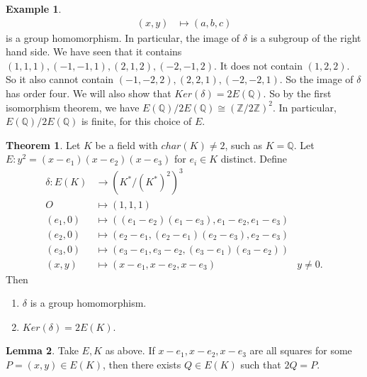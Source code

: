 \documentclass{article}
\newcommand{\Z}{\mathbb{Z}}
\newcommand{\Q}{\mathbb{Q}}
\newcommand{\rb}[1]{\left( #1 \right)}
\theoremstyle{definition}\newtheorem{definition}{Definition}[section]
\theoremstyle{definition}\newtheorem{remark}[definition]{Remark}
\theoremstyle{definition}\newtheorem*{example}{Example}
\theoremstyle{definition}\newtheorem*{note}{Note}
\newtheorem{lemma}[definition]{Lemma}
\newtheorem{theorem}[definition]{Theorem}
\begin{document}
\begin{example}
\begin{align*}
\rb{x, y} & \mapsto \rb{a, b, c}
\end{align*}
is a group homomorphism. In particular, the image of $ \delta $ is a subgroup of the right hand side. We have seen that it contains $ \rb{1, 1, 1}, \rb{-1, -1, 1}, \rb{2, 1, 2}, \rb{-2, -1, 2} $. It does not contain $ \rb{1, 2, 2} $. So it also cannot contain $ \rb{-1, -2, 2}, \rb{2, 2, 1}, \rb{-2, -2, 1} $. So the image of $ \delta $ has order four. We will also show that $ Ker\rb{\delta} = 2E\rb{\Q} $. So by the first isomorphism theorem, we have $ E\rb{\Q} / 2E\rb{\Q} \cong \rb{\Z / 2\Z}^2 $. In particular, $ E\rb{\Q} / 2E\rb{\Q} $ is finite, for this choice of $ E $.
\end{example}


\begin{theorem}
\label{thm:8.2}
Let $ K $ be a field with $ char\rb{K} \ne 2 $, such as $ K = \Q $. Let $ E : y^2 = \rb{x - e_1}\rb{x - e_2}\rb{x - e_3} $ for $ e_i \in K $ distinct. Define
\begin{align*}
\delta : E\rb{K} & \to \rb{K^* / \rb{K^*}^2}^3 \\
O & \mapsto \rb{1, 1, 1} \\
\rb{e_1, 0} & \mapsto \rb{\rb{e_1 - e_2}\rb{e_1 - e_3}, e_1 - e_2, e_1 - e_3} \\
\rb{e_2, 0} & \mapsto \rb{e_2 - e_1, \rb{e_2 - e_1}\rb{e_2 - e_3}, e_2 - e_3} \\
\rb{e_3, 0} & \mapsto \rb{e_3 - e_1, e_3 - e_2, \rb{e_3 - e_1}\rb{e_3 - e_2}} \\
\rb{x, y} & \mapsto \rb{x - e_1, x - e_2, x - e_3} & y \ne 0.
\end{align*}
Then
\begin{enumerate}
\item $ \delta $ is a group homomorphism.
\item $ Ker\rb{\delta} = 2E\rb{K} $.
\end{enumerate}
\end{theorem}

\begin{lemma}
\label{lem:8.3}
Take $ E, K $ as above. If $ x - e_1, x - e_2, x - e_3 $ are all squares for some $ P = \rb{x, y} \in E\rb{K} $, then there exists $ Q \in E\rb{K} $ such that $ 2Q = P $.
\end{lemma}
\end{document}

